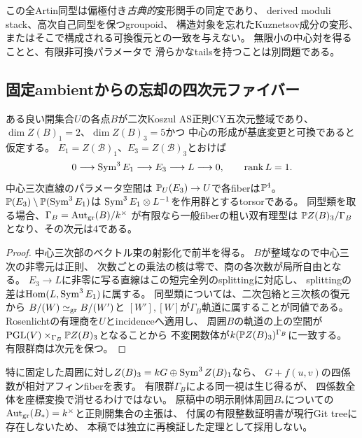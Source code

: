 \begin{remark}[明確に主張しない事柄]
\label{rem:artin-limits}
この全Artin同型は偏極付き\emph{古典的}変形関手の同定であり、
derived moduli stack、高次自己同型を保つgroupoid、
構造対象を忘れたKuznetsov成分の変形、
またはそこで構成される可換復元との一致を与えない。
無限小の中心対を得ることと、有限非可換パラメータで
滑らかなtailsを持つことは別問題である。
\end{remark}

\subsection{固定ambientからの忘却の四次元ファイバー}
\begin{proposition}[中心三次直線の射影束]
\label{prop:artin-fixed-ambient-fiber}
ある良い開集合$U$の各点$B$が二次Koszul AS正則CY五次元整域であり、
$\dim Z(B)_1=2$、$\dim Z(B)_3=5$かつ
中心の形成が基底変更と可換であると仮定する。
$E_1=Z(\mathscr B)_1$、$E_3=Z(\mathscr B)_3$とおけば
\[
 0\longrightarrow\operatorname{Sym}^3E_1\longrightarrow E_3
 \longrightarrow L\longrightarrow0,\qquad\operatorname{rank} L=1.
\]
中心三次直線のパラメータ空間は
$\mathbb P_U(E_3)\to U$で各fiberは$\mathbb P^4$。
$\mathbb P(E_3)\setminus\mathbb P(\operatorname{Sym}^3E_1)$は
$\operatorname{Sym}^3E_1\otimes L^{-1}$を作用群とするtorsorである。
同型類を取る場合、$\Gamma_B=\operatorname{Aut}_{\operatorname{gr}}(B)/k^\times$
が有限なら一般fiberの粗い双有理型は
$\mathbb P Z(B)_3/\Gamma_B$となり、その次元は4である。
\end{proposition}
\begin{proof}
中心三次部のベクトル束の射影化で前半を得る。
$B$が整域なので中心三次の非零元は正則、
次数ごとの乗法の核は零で、商の各次数が局所自由となる。
$E_3\to L$に非零に写る直線はこの短完全列のsplittingに対応し、
splittingの差は$\operatorname{Hom}(L,\operatorname{Sym}^3E_1)$に属する。
同型類については、二次包絡と三次核の復元から
$B/(W)\simeq_{\operatorname{gr}}B/(W')$と
$[W'],[W]$が$\Gamma_B$軌道に属することが同値である。
Rosenlichtの有理商を$U$とincidenceへ適用し、
周囲$B$の軌道の上の空間が
$\mathrm{PGL}(V)\times_{\Gamma_B}\mathbb P Z(B)_3$となることから
不変関数体が$k(\mathbb P Z(B)_3)^{\Gamma_B}$に一致する。
有限群商は次元を保つ。
\end{proof}

\begin{remark}[四係数は標識を忘れても消えない]
特に固定した周囲に対し$Z(B)_3=kG\oplus\operatorname{Sym}^3Z(B)_1$なら、
$G+f(u,v)$の四係数が相対アフィンfiberを表す。
有限群$\Gamma_B$による同一視は生じ得るが、
四係数全体を座標変換で消せるわけではない。
原稿中の明示剛体周囲$B_*$についての
$\operatorname{Aut}_{\operatorname{gr}}(B_*)=k^\times$と正則開集合の主張は、
付属の有限整数証明書が現行Git treeに存在しないため、
本稿では独立に再検証した定理として採用しない。
\end{remark}

